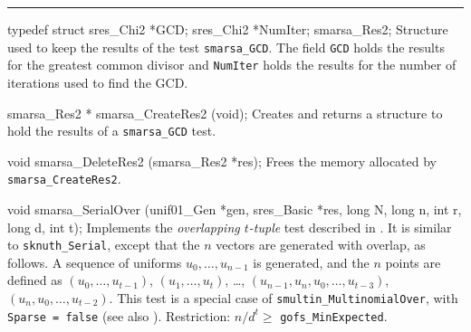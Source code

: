 \bigskip\hrule\bigskip

\code

typedef struct {
   sres_Chi2 *GCD;
   sres_Chi2 *NumIter;
} smarsa_Res2;
\endcode
 \tab
  Structure used to keep the results of the test {\tt smarsa\_GCD}.
  The field {\tt GCD} holds the results for the greatest common divisor and
  {\tt NumIter} holds the results for the number of iterations used to
  find the GCD.
 \endtab
\code


smarsa_Res2 * smarsa_CreateRes2 (void);
\endcode
 \tab
  Creates and returns a structure to hold the results of a
 {\tt smarsa\_GCD} test.
 \endtab
\code


void smarsa_DeleteRes2 (smarsa_Res2 *res);
\endcode
 \tab
  Frees the memory allocated by {\tt smarsa\_CreateRes2}.
 \endtab

\fi  %


\code


void smarsa_SerialOver (unif01_Gen *gen, sres_Basic *res,
                        long N, long n, int r, long d, int t);
\endcode
 \tab
  Implements the {\em overlapping $t$-tuple\/}
  test described in
  \cite {rALT88a,rMAR85a}.
  It is similar to {\tt sknuth\_Serial}, except that the $n$ vectors
  are generated with overlap, as follows.
  A sequence of uniforms $u_0,\dots,u_{n-1}$ is generated, and the
  $n$ points are defined as $(u_0,\dots,u_{t-1})$, $(u_1,\dots,u_t)$,
   \dots, $(u_{n-1},u_n,u_0,\dots,u_{t-3})$, $(u_n,u_0,\dots,u_{t-2})$.
\iffalse %
 This function generates $n$ points in
  the unit hypercube in $t$ dimensions, using $t$ successive values
  returned by the  generator, which will make the
   components of a vector in $t$ dimensions, the $i$-th generated
  value being the first component of the $i$-th vector.
  It generates only $n$ values which form a
  circular sequence: for $i > n-t+1$, the last $i-n+t-1$  components
  of vector $i$ are the first $i-n+t-1$ values.
  Then it divides the interval $[0,1)$ in $d$ equal segments; this gives
  a partition of the hypercube $[0,1)^t$ in $k = d^{t}$ cells.
\fi  %
  This test is a special case of {\tt smultin\_Multino\-mial\-Over},
  with {\tt Sparse = false} (see also \cite{rLEC02c}).
  Restriction: $n/d^{t} \ge$ {\tt gofs\_MinExpected}.
 \endtab
\code


